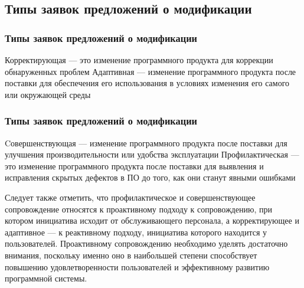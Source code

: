 \documentclass{../industrial-development}
\begin{document}
\lecturenotes


\subsection{Типы заявок предложений о модификации}
\begin{frame} \frametitle{Типы заявок предложений о модификации}
	\begin{definition}
		\alert{Корректирующая} --- это изменение программного продукта для коррекции обнаруженных проблем\newline
		\alert{Адаптивная} --- изменение программного продукта после поставки для обеспечения его использования в условиях изменения его самого или окружающей среды
	\end{definition}
\end{frame}


\begin{frame} \frametitle{Типы заявок предложений о модификации}
	\begin{definition}
		\alert{Cовершенствующая} --- изменение программного продукта после поставки для улучшения производительности или удобства эксплуатации\newline
		\alert{Профилактическая} ---  это изменение программного продукта после поставки для выявления и исправления скрытых дефектов в ПО до того, как они станут явными ошибками
	\end{definition}
\end{frame}

\lecturenotes
Следует также отметить, что профилактическое и совершенствующее сопровождение относятся к проактивному подходу к сопровождению, при котором инициатива исходит от обслуживающего персонала, а корректирующее и адаптивное — к реактивному подходу, инициатива которого находится у пользователей. 
Проактивному сопровождению необходимо уделять достаточно внимания, поскольку именно оно в наибольшей степени способствует повышению удовлетворенности пользователей и эффективному развитию программной системы. 

\end{document}
